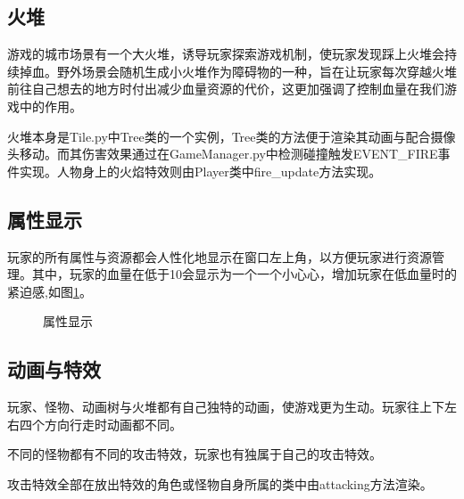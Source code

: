 \documentclass{ctexart}
\begin{document}
\subsection{火堆}
游戏的城市场景有一个大火堆，诱导玩家探索游戏机制，使玩家发现踩上火堆会持续掉血。野外场景会随机生成小火堆作为障碍物的一种，旨在让玩家每次穿越火堆前往自己想去的地方时付出减少血量资源的代价，这更加强调了控制血量在我们游戏中的作用。

火堆本身是Tile.py中Tree类的一个实例，Tree类的方法便于渲染其动画与配合摄像头移动。而其伤害效果通过在GameManager.py中检测碰撞触发EVENT\_FIRE事件实现。人物身上的火焰特效则由Player类中fire\_update方法实现。
\subsection{属性显示}
玩家的所有属性与资源都会人性化地显示在窗口左上角，以方便玩家进行资源管理。其中，玩家的血量在低于10会显示为一个一个小心心，增加玩家在低血量时的紧迫感,如图\ref{fig:属性显示}。
\begin{figure}[h]
\centering
{}
\caption{\label{fig:属性显示}属性显示}
\end{figure}

\subsection{动画与特效}
玩家、怪物、动画树与火堆都有自己独特的动画，使游戏更为生动。玩家往上下左右四个方向行走时动画都不同。

不同的怪物都有不同的攻击特效，玩家也有独属于自己的攻击特效。

攻击特效全部在放出特效的角色或怪物自身所属的类中由attacking方法渲染。
\end{document}

